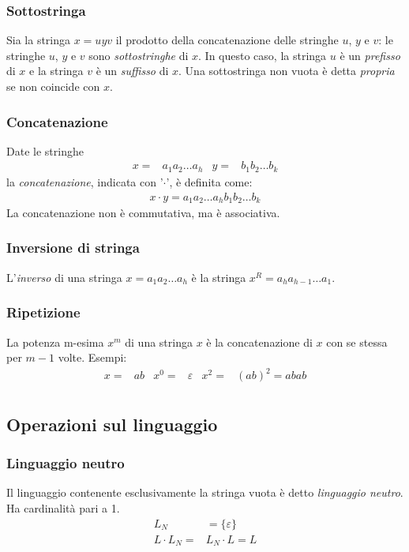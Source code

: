 \documentclass[11pt]{article}
\begin{document}
\subsubsection*{Sottostringa}
Sia la stringa $x=uyv$ il prodotto della concatenazione delle stringhe $u$, $y$ e $v$: le stringhe $u$, $y$ e $v$ sono 
\textit{sottostringhe} di $x$. In questo caso, la stringa $u$ è un \textit{prefisso} di $x$ e la stringa $v$ è un 
\textit{suffisso} di $x$. Una sottostringa non vuota è detta \textit{propria} se non coincide con $x$.
\subsubsection*{Concatenazione}
Date le stringhe
\begin{align*}
    x=&a_1a_2\dots a_h   &   y=&b_1b_2\dots b_k
\end{align*}
la \textit{concatenazione}, indicata con '$\cdot$', è definita come:
\begin{align*}
    x\cdot y=a_1a_2\dots a_hb_1b_2\dots b_k
\end{align*}
La concatenazione non è commutativa, ma è associativa.
\subsubsection*{Inversione di stringa}
L'\textit{inverso} di una stringa $x=a_1a_2\dots a_h$ è la stringa $x^R=a_ha_{h-1}\dots a_1$.
\subsubsection*{Ripetizione}
La potenza m-esima $x^m$ di una stringa $x$ è la concatenazione di $x$ con se stessa per $m-1$ volte. Esempi:
\begin{align*}
    x=&ab    &   x^0=&\varepsilon    &   x^2=&(ab)^2=abab\\  
\end{align*}
\subsection{Operazioni sul linguaggio}
\subsubsection*{Linguaggio neutro}
Il linguaggio contenente esclusivamente la stringa vuota è detto \textit{linguaggio neutro}. Ha cardinalità pari a 1.
\begin{align*}
    L_N &= \{\varepsilon\}\\
    L\cdot L_N=&L_N\cdot L=L
\end{align*}
\end{document}
